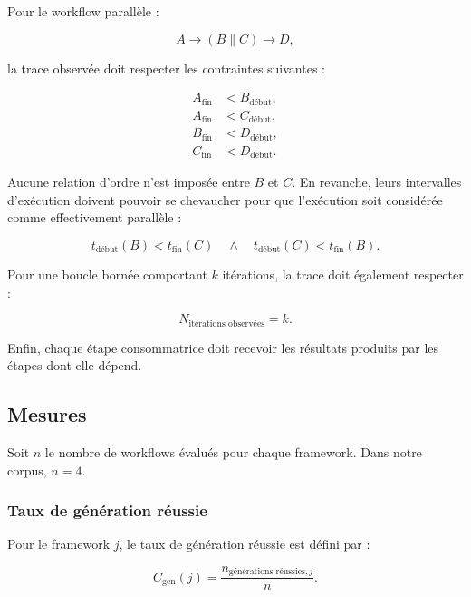 Pour le workflow parallèle :

\begin{equation}
A \rightarrow (B \parallel C) \rightarrow D,
\end{equation}

la trace observée doit respecter les contraintes suivantes :

\begin{align}
A_{\text{fin}} &< B_{\text{début}}, \\
A_{\text{fin}} &< C_{\text{début}}, \\
B_{\text{fin}} &< D_{\text{début}}, \\
C_{\text{fin}} &< D_{\text{début}}.
\end{align}

Aucune relation d'ordre n'est imposée entre $B$ et $C$. En revanche,
leurs intervalles d'exécution doivent pouvoir se chevaucher pour que
l'exécution soit considérée comme effectivement parallèle :

\begin{equation}
t_{\text{début}}(B) < t_{\text{fin}}(C)
\quad \land \quad
t_{\text{début}}(C) < t_{\text{fin}}(B).
\label{eq:chevauchement-parallele}
\end{equation}

Pour une boucle bornée comportant $k$ itérations, la trace doit
également respecter :

\begin{equation}
N_{\text{itérations observées}} = k.
\end{equation}

Enfin, chaque étape consommatrice doit recevoir les résultats produits
par les étapes dont elle dépend.


\subsection{Mesures}
\label{subsec:mesures-correction}

Soit $n$ le nombre de workflows évalués pour chaque framework. Dans
notre corpus, $n=4$.


\subsubsection{Taux de génération réussie}

Pour le framework $j$, le taux de génération réussie est défini par :

\begin{equation}
C_{\mathrm{gen}}(j)
=
\frac{
    n_{\text{générations réussies},j}
}{
    n
}.
\label{eq:taux-generation}
\end{equation}


